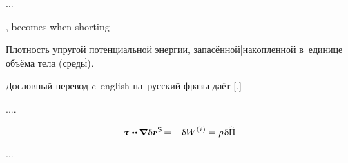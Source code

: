 ...




{\small
\setlength{\parindent}{0pt}

\begin{leftverticalbar}%

,
becomes when shorting

\begin{otherlanguage}{russian}
Плотность
упругой потенциальной энергии,
запасённой|накопленной
в~единице объёма тела (сред\'{ы}).
\end{otherlanguage}

\begin{otherlanguage}{russian}
Дословный перевод
c~english на~русский
фразы
даёт
[.]
\end{otherlanguage}

\end{leftverticalbar}
\par}


....


\begin{equation}
\cauchystress \dotdotp \hspace{-0.12ex} \boldnabla \hspace{.1ex} \variation{\currentlocationvector}^{\mathsf{S}} \hspace{-0.25ex}
= \hspace{-0.2ex} - \hspace{.2ex} \variation{\internalwork}
= \rho \hspace{.2ex} \variation{\widetilde{\potentialenergydensity}}
\end{equation}

...

